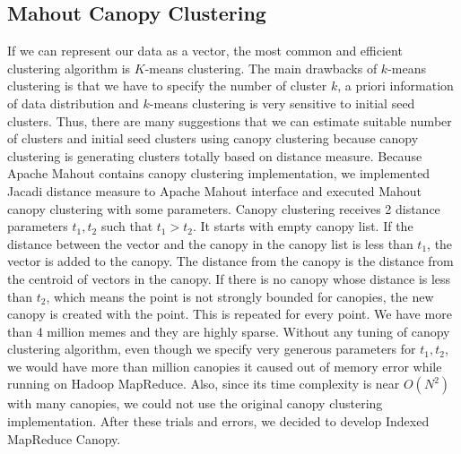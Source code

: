 \documentclass{sig-alternate}
\begin{document}
\subsection{Mahout Canopy Clustering}
If we can represent our data as a vector, the most common and efficient clustering algorithm is $K$-means clustering. The main drawbacks of $k$-means clustering is that we have to specify the number of cluster $k$, a priori information of data distribution and $k$-means clustering is very sensitive to initial seed clusters. Thus, there are many suggestions that we can estimate suitable number of clusters and initial seed clusters using canopy clustering \cite{McCallum2000} because canopy clustering is generating clusters totally based on distance measure. Because Apache Mahout contains canopy clustering implementation, we implemented Jacadi distance measure to Apache Mahout interface and executed Mahout canopy clustering with some parameters. Canopy clustering receives 2 distance parameters $t_1, t_2$ such that $t_1 > t_2$. It starts with empty canopy list. If the distance between the vector and the canopy in the canopy list is less than $t_1$, the vector is added to the canopy. The distance from the canopy is the distance from the centroid of vectors in the canopy. If there is no canopy whose distance is less than $t_2$, which means the point is not strongly bounded for canopies, the new canopy is created with the point. This is repeated for every point.
We have more than 4 million memes and they are highly sparse. Without any tuning of canopy clustering algorithm, even though we specify very generous parameters for $t_1,t_2$, we would have more than million canopies it caused out of memory error while running on Hadoop MapReduce. Also, since its time complexity is near $O(N^2)$ with many canopies, we could not use the original canopy clustering implementation. After these trials and errors, we decided to develop Indexed MapReduce Canopy.
\end{document}
